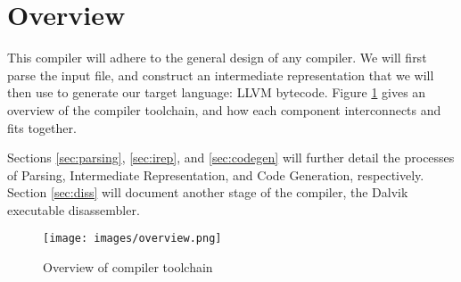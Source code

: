 \section{Overview}

This compiler will adhere to the general design of any compiler. We will first parse the input file, and construct an intermediate representation that we will then use to generate our target language: LLVM bytecode. Figure \ref{fig:overview} gives an overview of the compiler toolchain, and how each component interconnects and fits together.

Sections \ref{sec:parsing}, \ref{sec:irep}, and \ref{sec:codegen} will further detail the processes of Parsing, Intermediate Representation, and Code Generation, respectively. Section \ref{sec:diss} will document another stage of the compiler, the Dalvik executable disassembler.

\begin{figure}[h!]
    \centering
    \texttt{[image: images/overview.png]}
    \caption{Overview of compiler toolchain}
    \label{fig:overview}
\end{figure}
